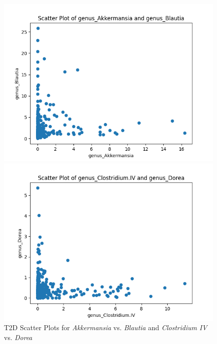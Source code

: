 \documentclass[12pt,letterpaper]{article}
\begin{document}
\begin{figure}[h!]
\begin{minipage}{0.47\linewidth}
  \centering
  \includegraphics[width=\linewidth]{../plots/t2d/linearity/norm/genus_Akkermansia_vs_genus_Blautia.png}
\end{minipage}%
\begin{minipage}{0.47\linewidth}
   \centering
   \includegraphics[width=\linewidth]{../plots/t2d/linearity/norm/genus_Clostridium.IV_vs_genus_Dorea.png}
\end{minipage}
\caption{T2D Scatter Plots for \textit{Akkermansia} vs. \textit{Blautia} and \textit{Clostridium IV} vs. \textit{Dorea}}
\label{fig:t2dscatterplots}
\end{figure}
\end{document}
